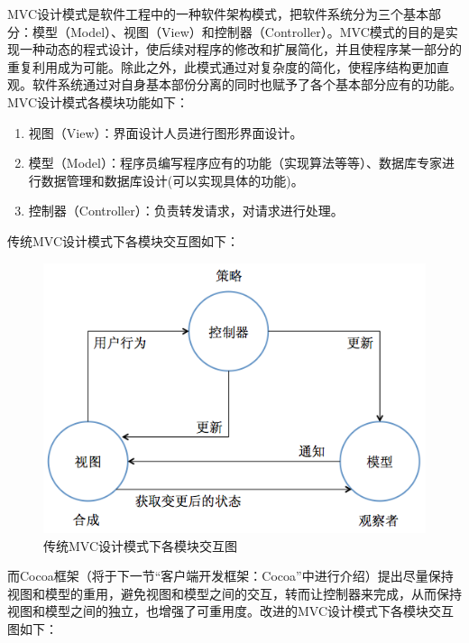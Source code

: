 \documentclass{article}
\begin{document}
\begin{CJK}{UTF8}{gbsn}
  MVC设计模式是软件工程中的一种软件架构模式，把软件系统分为三个基本部分：模型（Model）、视图（View）和控制器（Controller）。MVC模式的目的是实现一种动态的程式设计，使后续对程序的修改和扩展简化，并且使程序某一部分的重复利用成为可能。除此之外，此模式通过对复杂度的简化，使程序结构更加直观。软件系统通过对自身基本部份分离的同时也赋予了各个基本部分应有的功能。MVC设计模式各模块功能如下：

  \begin{enumerate}
    \item 视图（View）：界面设计人员进行图形界面设计。
    \item 模型（Model）：程序员编写程序应有的功能（实现算法等等）、数据库专家进行数据管理和数据库设计(可以实现具体的功能)。
    \item 控制器（Controller）：负责转发请求，对请求进行处理。
  \end{enumerate}

  传统MVC设计模式下各模块交互图如下：

  \begin{figure}[htbp]
		\centering
		\includegraphics[bb=0 0 513 355, scale=0.45]{figure/fig_n01.png}
		\caption{传统MVC设计模式下各模块交互图}
		\label{fig:n01}
	\end{figure}

  而Cocoa框架（将于下一节“客户端开发框架：Cocoa”中进行介绍）提出尽量保持视图和模型的重用，避免视图和模型之间的交互，转而让控制器来完成，从而保持视图和模型之间的独立，也增强了可重用度。改进的MVC设计模式下各模块交互图如下：


\end{CJK}
\end{document}
